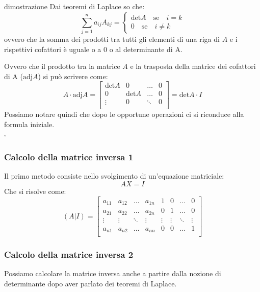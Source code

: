 \documentclass[x11names]{article}
\newcommand*{\QEDB}{\null\nobreak\hfill\ensuremath{\square}}%
\begin{document}
\begin{es}{dimostrazione}
Dai teoremi di Laplace so che:
\[
	\sum_{j=1}^n a_{ij}A_{kj} = \left\{\begin{array}{c} \text{det}A \quad \text{se} \quad i = k \\ 0 \quad \text{se}\quad i \neq k \end{array} \right
.\] 
ovvero che la somma dei prodotti tra tutti gli elementi di una riga di $A$ e i rispettivi cofattori è uguale o a $0$ o al determinante di A.

Ovvero che il prodotto tra la matrice $A$ e la trasposta della matrice dei cofattori di A ($\text{adj}A$) si può scrivere come:
\[
A \cdot \text{adj}A = \begin{bmatrix}
	\text{det}A & 0 & \dots & 0 \\
	0 & \text{det}A & \dots & 0\\
	\vdots & 0 &  \ddots & 0 \\

\end{bmatrix}
= \text{det}A \cdot I
\]
Possiamo notare quindi che dopo le opportune operazioni ci si riconduce alla formula iniziale.
\\
\QEDB
\end{es}



\subsubsection{Calcolo della matrice inversa 1}
Il primo metodo consiste nello svolgimento di un'equazione matriciale:
$$
AX = I
$$
Che si risolve come:
$$
(A|I) = \left[\begin{array}{cccc|cccc}
    a_{11} & a_{12} & \dots & a_{1n} & 1 & 0& \dots & 0 \\
    a_{21} & a_{22} & \dots & a_{2n} & 0 & 1& \dots & 0 \\
    \vdots & \vdots & \ddots & \vdots &  \vdots &  \vdots& \ddots & \vdots \\
    a_{n1} & a_{n2} & \dots & a_{nn} & 0 & 0& \dots & 1 \\
\end{array}\right]
$$

\subsubsection{Calcolo della matrice inversa 2}
Possiamo calcolare la matrice inversa anche a partire dalla nozione di determinante dopo aver parlato dei teoremi di Laplace.
\end{document}
